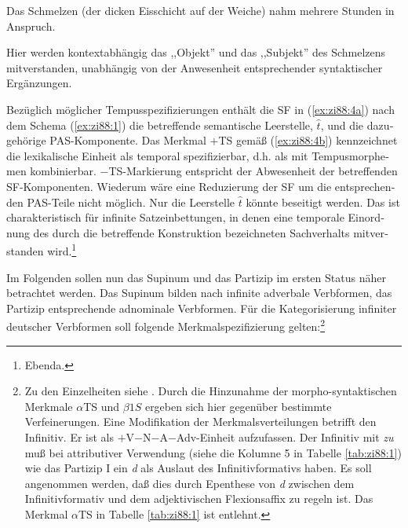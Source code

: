 \documentclass[output=paper,colorlinks,citecolor=brown, booklanguage=german]{langscibook}
\begin{document}
\begin{otherlanguage}{german}
\ea\label{ex:zi88:6} Das Schmelzen (der dicken Eisschicht auf der Weiche) nahm mehrere Stunden in Anspruch.
\z 


\largerpage
\noindent Hier werden kontextabhängig das ,,Objekt'' und das ,,Subjekt'' des Schmelzens mitverstanden, unabhängig von der Anwesenheit entsprechender syntaktischer Ergänzungen.

Bezüglich möglicher Tempusspezifizierungen enthält die SF in (\ref{ex:zi88:4a}) nach dem Schema (\ref{ex:zi88:1}) die betreffende semantische Leerstelle, $\hat{t}$, und die dazugehörige PAS-Komponente. Das Merkmal $+$TS gemäß (\ref{ex:zi88:4b}) kennzeichnet die lexikalische Einheit als temporal spezifizierbar, d.h. als mit Tempusmorphemen kombinierbar. $-$TS-Markierung entspricht der Abwesenheit der betreffenden SF-Komponenten. Wiederum wäre eine Reduzierung der SF um die entsprechenden PAS-Teile nicht möglich. Nur die Leerstelle $\hat{t}$ könnte beseitigt werden. Das ist charakteristisch für infinite Satzeinbettungen, in denen eine temporale Einordnung des durch die betreffende Konstruktion bezeichneten Sachverhalts mitverstanden wird.\footnote{Ebenda.}

\largerpage
Im Folgenden sollen nun das Supinum und das Partizip im ersten Status näher betrachtet werden. Das Supinum bilden nach \citet{Bech1955} infinite adverbale Verbformen, das Partizip entsprechende adnominale Verbformen. Für die Kategorisierung infiniter deutscher Verbformen soll folgende Merkmalspezifizierung gelten:\footnote{Zu den Einzelheiten siehe \citet{Zimmermann1988-druck,Zimmermann1987d}. Durch die Hinzunahme der morpho-syntaktischen Merkmale $\alpha$TS und $\beta 1S$ ergeben sich hier gegenüber \citet{Zimmermann1988-druck} bestimmte Verfeinerungen. Eine Modifikation der Merkmalsverteilungen betrifft den Infinitiv. Er ist als $+$V$-$N$-$A$-$Adv-Einheit aufzufassen. Der Infinitiv mit \textit{zu} muß bei attributiver Verwendung (siehe die Kolumne 5 in Tabelle \ref{tab:zi88:1}) wie das Partizip I ein \textit{d} als Auslaut des Infinitivformativs haben. Es soll angenommen werden, daß dies durch Epenthese von \textit{d} zwischen dem Infinitivformativ und dem adjektivischen Flexionsaffix zu regeln ist. Das Merkmal $\alpha$TS in Tabelle \ref{tab:zi88:1} ist \citet{Bierwisch1987d} entlehnt.}


\end{otherlanguage}
\end{document}
